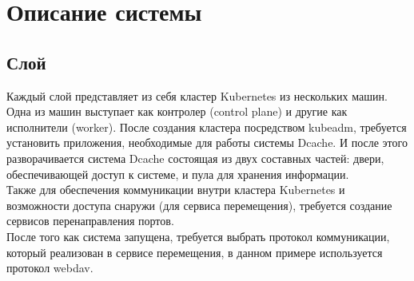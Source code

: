 \documentclass{article}
\begin{document}
\tableofcontents
\newpage

\section{Описание системы}
\subsection{Слой}
Каждый слой представляет из себя кластер Kubernetes из нескольких машин. Одна из машин выступает как контролер (control plane) и другие как исполнители (worker). После создания кластера посредством kubeadm, требуется установить приложения, необходимые для работы системы Dcache.
И после этого разворачивается система Dcache состоящая из двух составных частей: двери, обеспечивающей доступ к системе, и пула для хранения информации.\\
Также для обеспечения коммуникации внутри кластера Kubernetes и возможности доступа снаружи (для сервиса перемещения), требуется создание сервисов перенаправления портов.\\
После того как система запущена, требуется выбрать протокол коммуникации, который реализован в сервисе перемещения, в данном примере используется протокол webdav. 
\end{document}
